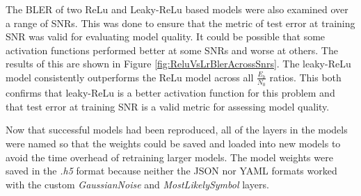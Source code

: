 \documentclass[12pt,onecolumn,letterpaper]{article}
\newcommand{\code}{\textit}
\begin{document}
The BLER of two ReLu and Leaky-ReLu based models were also examined over a range of SNRs. This was done to ensure that the metric of test error at training SNR was valid for evaluating model quality. It could be possible that some activation functions performed better at some SNRs and worse at others. The results of this are shown in Figure \ref{fig:ReluVsLrBlerAcrossSnrs}. The leaky-ReLu model consistently outperforms the ReLu model across all $\frac{E_b}{N_0}$ ratios. This both confirms that leaky-ReLu is a better activation function for this problem and that test error at training SNR is a valid metric for assessing model quality.

Now that successful models had been reproduced, all of the layers in the models were named so that the weights could be saved and loaded into new models to avoid the time overhead of retraining larger models. The model weights were saved in the \code{.h5} format because neither the JSON nor YAML formats worked with the custom \code{GaussianNoise} and \code{MostLikelySymbol} layers.
\end{document}
